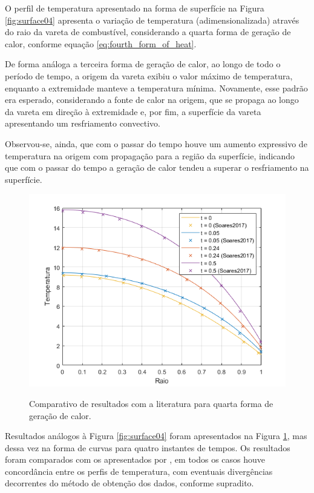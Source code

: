 O perfil de temperatura apresentado na forma de superfície na Figura \ref{fig:surface04} apresenta o variação de temperatura (adimensionalizada) através do raio da vareta de combustível, considerando a quarta forma de geração de calor, conforme equação \ref{eq:fourth_form_of_heat}.

De forma análoga a terceira forma de geração de calor, ao longo de todo o período de tempo, a origem da vareta exibiu o valor máximo de temperatura, enquanto a extremidade manteve a temperatura mínima. Novamente, esse padrão era esperado, considerando a fonte de calor na origem, que se propaga ao longo da vareta em direção à extremidade e, por fim, a superfície da vareta apresentando um resfriamento convectivo.

Observou-se, ainda, que com o passar do tempo houve um aumento expressivo de temperatura na origem com propagação para a região da superfície, indicando que com o passar do tempo a geração de calor tendeu a superar o resfriamento na superfície.

\begin{figure}[H]
    \centering
    \caption{Comparativo de resultados com a literatura para quarta forma de geração de calor.}
    \includegraphics[scale=0.7]{figures/results/Fig14.png}
    \label{fig:profile04}
\end{figure}

Resultados análogos à Figura \ref{fig:surface04} foram apresentados na Figura \ref{fig:profile04}, mas dessa vez na forma de curvas para quatro instantes de tempos. Os resultados foram comparados com os apresentados por \citet{soares2017}, em todos os casos houve concordância entre os perfis de temperatura, com eventuais divergências decorrentes do método de obtenção dos dados, conforme supradito.


